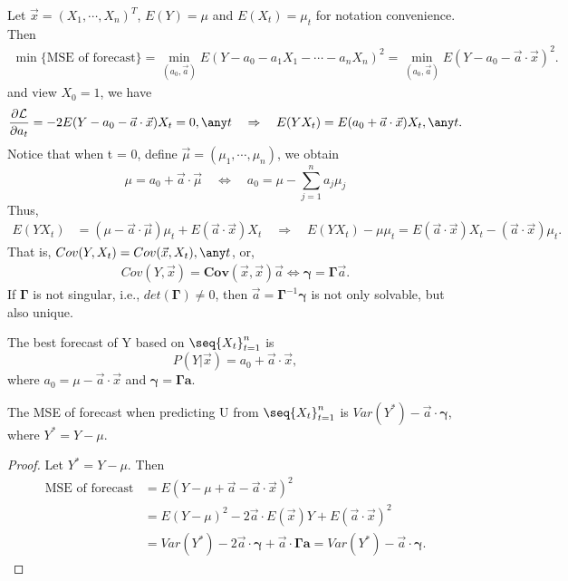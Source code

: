 Let $\Vec{x} = (X_1, \cdots, X_n)^T$, $E(Y) = \mu$ and $E(X_t) = \mu_t$ for notation convenience. Then
\begin{align*}
    \min \{\text{MSE of forecast}\} = \min_{(a_0,\Vec{a})} E(Y - a_0 - a_1 X_1 -  \cdots - a_n X_n)^2 = \min_{(a_0,\Vec{a})} E(Y - a_0 - \Vec{a}\cdot \Vec{x})^2.
\end{align*}
\indent and view $X_0 = 1$, we have
\[
    \frac{\partial \mathcal{L}}{\partial a_t} = -2 E(Y - a_0 - \Vec{a}\cdot \Vec{x}) X_t = 0, \any t \quad \Rightarrow \quad E(Y X_t) = E(a_0 + \Vec{a} \cdot \Vec{x})X_t, \any t.
\]
\indent Notice that when t = 0, define $\Vec{\mu} = (\mu_1,\cdots ,\mu_n)$, we obtain 
\[
    \mu = a_0 + \Vec{a} \cdot \Vec{\mu} \quad \Leftrightarrow \quad a_0 = \mu - \sum_{j=1}^{n} a_j \mu_j
\]
\indent Thus,
\begin{align*}
    E(Y X_t) &= (\mu - \Vec{a} \cdot \Vec{\mu}) \mu_t + E(\Vec{a} \cdot \Vec{x}) X_t \quad \Rightarrow \quad E(Y X_t) - \mu \mu_t = E(\Vec{a} \cdot \Vec{x})X_t  - (\Vec{a} \cdot \Vec{x})\mu_t.
\end{align*}
\indent That is, $Cov(Y, X_t) = Cov (\Vec{x}, X_t), \any t$, or,
\begin{align*}
    Cov(Y, \Vec{x}) = \bm{Cov} (\Vec{x}, \Vec{x}) \Vec{a} \Leftrightarrow \bm{\gamma} = \bm{\Gamma}\Vec{a}.
\end{align*}
\indent If $\bm{\Gamma}$ is not singular, i.e., $det(\bm{\Gamma}) \neq 0$, then $\Vec{a} = \bm{\Gamma}^{-1} \bm{\gamma}$ is not only solvable, but also unique.

\begin{theorem}
The best  forecast of Y based on $\seq{X_t}_{t=1}^{n}$ is 
\[
    P(Y|\Vec{x}) = a_0 + \Vec{a} \cdot \Vec{x},
\]
where $a_0 = \mu - \Vec{a} \cdot \Vec{x}$ and $\bm{\gamma} = \bm{\Gamma a}$.
\end{theorem}

\begin{theorem}
The MSE of forecast when predicting U from $\seq{X_t}_{t=1}^{n}$ is $Var(Y^*) - \Vec{a} \cdot \bm{\gamma}$, where $Y^* = Y - \mu$.
\end{theorem}

\begin{proof}
Let $Y^* = Y - \mu$. Then
\begin{align*}
    \text{MSE of forecast} &= E(Y - \mu + \Vec{a} - \Vec{a} \cdot \Vec{x})^2\\
    &=E(Y - \mu)^2 - 2\Vec{a} \cdot E(\Vec{x})Y + E(\Vec{a} \cdot \Vec{x})^2\\
    &=Var(Y^*) - 2 \Vec{a} \cdot \bm{\gamma} + \Vec{a} \cdot \bm{\Gamma a} = Var(Y^*) - \Vec{a} \cdot \bm{\gamma}. 
\end{align*}
\end{proof}

